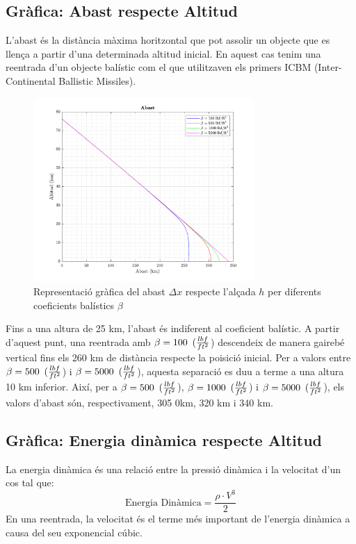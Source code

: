 \subsection{Gràfica: Abast respecte Altitud}
L'abast és la distància màxima horitzontal que pot assolir un objecte que es llença a partir d'una determinada altitud inicial. En aquest cas tenim una reentrada d'un objecte balístic com el que utilitzaven els primers ICBM (Inter-Continental Ballistic Missiles).
\begin{figure}[ht]
    \centering
    \includegraphics[width=0.75\textwidth]{imagenes/01_ballistic_graficas/abast.pdf}
    \caption{Representació gràfica del abast $\Delta x$ respecte l'alçada $h$ per diferents coeficients balístics $\beta$}
    \label{fig:abast}
\end{figure}

Fins a una altura de 25 km, l'abast és indiferent al coeficient balístic. A partir d'aquest punt, una reentrada amb $\beta = 100 \enskip (\frac{lbf}{ft^2}$) descendeix de manera gairebé vertical fins els 260 km de distància respecte la poisició inicial. Per a valors entre $\beta = 500 \enskip (\frac{lbf}{ft^2}$) i $\beta = 5000 \enskip (\frac{lbf}{ft^2}$), aquesta separació es duu a terme a una altura 10 km inferior. Així, per a $\beta = 500 \enskip (\frac{lbf}{ft^2}$), $\beta = 1000 \enskip (\frac{lbf}{ft^2}$) i $\beta = 5000 \enskip (\frac{lbf}{ft^2}$), els valors d'abast són, respectivament, 305 0km, 320 km i 340 km.

\newpage
\subsection{Gràfica: Energia dinàmica respecte Altitud}
La energia dinàmica és una relació entre la pressió dinàmica i la velocitat d'un cos tal que:
\begin{equation}
    \text{Energia Dinàmica} = \frac{\rho \cdot V^3}{2}
\end{equation}
En una reentrada, la velocitat és el terme més important de l'energia dinàmica a causa del seu exponencial cúbic.

